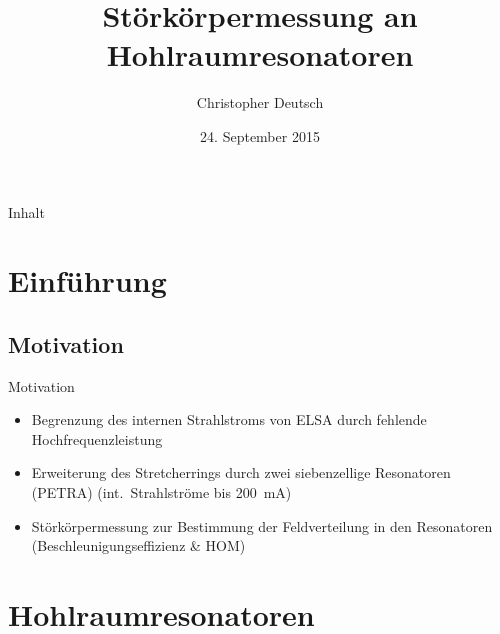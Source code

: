 \documentclass[12pt,xcolor=dvipsnames,professionalfonts]{beamer}
\author[Christopher Deutsch]
{Christopher Deutsch}
\title
{Störkörpermessung an Hohlraumresonatoren}
\subtitle
{}
\institute[]
{Rheinische Friedrich-Wilhelms-Universität Bonn \\
Seminar zur Bachelorarbeit SS15}
\date{24. September 2015}
\begin{document}
\maketitle

\begin{frame}{Inhalt}
	\tableofcontents
\end{frame}

\section{Einführung}
\subsection{Motivation}
\begin{frame}{Motivation}
	\begin{itemize}
		\item Begrenzung des internen Strahlstroms von ELSA durch fehlende Hochfrequenzleistung
		\item Erweiterung des Stretcherrings durch zwei siebenzellige Resonatoren (PETRA) (int.\ Strahlströme bis \SI{200}{mA})
		\item Störkörpermessung zur Bestimmung der Feldverteilung in den Resonatoren (Beschleunigungseffizienz \& HOM)
	\end{itemize}
\end{frame}


\section{Hohlraumresonatoren}
\end{document}

